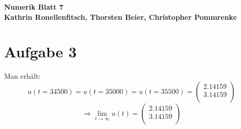 \documentclass[10pt,oneside,a4paper]{scrartcl}
\begin{document}
    \begin{center}
        \huge %
        \bfseries %
        \sffamily %
        Numerik Blatt 7\\[1em]
        \normalsize
        Kathrin Ronellenfitsch, Thorsten Beier, Christopher Pommrenke
    \end{center}

    \section*{Aufgabe 3}
    Man erhält:
    \begin{equation*}
        u(t = 34500) = u(t = 35000) = u(t = 35500) =  
        \begin{pmatrix}
            2.14159\\
            3.14159\\
        \end{pmatrix}
    \end{equation*}
    \begin{equation*}
        \Rightarrow
        \lim\limits_{t \rightarrow \infty}{u(t)} = 
        \begin{pmatrix}
            2.14159\\
            3.14159\\
        \end{pmatrix}
    \end{equation*}
\end{document}
